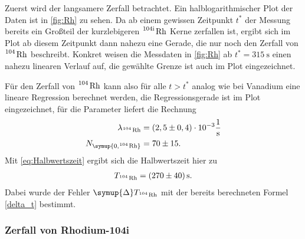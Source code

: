 Zuerst wird der langsamere Zerfall betrachtet. Ein halblogarithmischer Plot der Daten ist in \autoref{fig:Rh} zu sehen.
Da ab einem gewissen Zeitpunkt $t^*$ der Messung bereits ein
Großteil der kurzlebigeren $\ce{^{104\text{i}} Rh}$ Kerne zerfallen ist, ergibt sich im Plot ab diesem Zeitpunkt
dann nahezu eine Gerade, die nur noch den Zerfall von $\ce{^104 Rh}$ beschreibt.
Konkret weisen die Messdaten in \autoref{fig:Rh} ab $t^*=\qty{315}{\second}$ einen nahezu linearen Verlauf auf,
die gewählte Grenze ist auch im Plot eingezeichnet.

Für den Zerfall von $\ce{^104 Rh}$ kann also für alle $t>t^*$ analog wie bei Vanadium eine lineare Regression
berechnet werden, die Regressionsgerade ist im Plot eingezeichnet, für die Parameter liefert die Rechnung
\begin{align*}
  \lambda_{\ce{^104 Rh}} &= (2,5 \pm 0,4) \cdot 10^{-3} \unit{\per\second} \\
  N_{\symup{0, \ce{^104 Rh}}} &= 70 \pm 15.
\end{align*}
Mit \eqref{eq:Halbwertszeit} ergibt sich die Halbwertszeit hier zu
\begin{gather*}
  T_{\ce{^104 Rh}} = \qty{270+-40}{\second}.
\end{gather*}
Dabei wurde der Fehler $\symup{\Delta} T_{\ce{^104 Rh}}$ mit der bereits berechneten Formel
\eqref{delta_t} bestimmt.

\subsubsection{Zerfall von Rhodium-104i}

